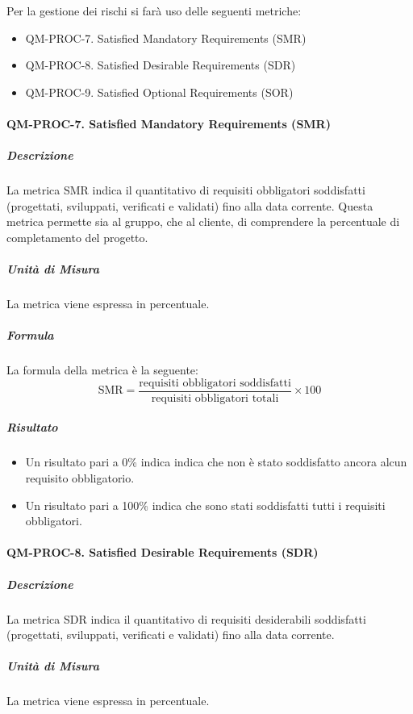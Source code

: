 		Per la gestione dei rischi si farà uso delle seguenti metriche:

		\begin{itemize}
			\item QM-PROC-7. Satisfied Mandatory Requirements (SMR)
			\item QM-PROC-8. Satisfied Desirable Requirements (SDR)
			\item QM-PROC-9. Satisfied Optional Requirements (SOR)
		\end{itemize}

		\paragraph{QM-PROC-7. Satisfied Mandatory Requirements (SMR)}

			\subparagraph{Descrizione}
			La metrica SMR indica il quantitativo di requisiti obbligatori soddisfatti (progettati, sviluppati, verificati e validati) fino alla data corrente. Questa metrica permette sia al gruppo, che al cliente, di comprendere la percentuale di completamento del progetto.

			\subparagraph{Unità di Misura}
			La metrica viene espressa in percentuale.

			\subparagraph{Formula}
			La formula della metrica è la seguente:
			\[
				\text{SMR} = \frac{\text{requisiti obbligatori soddisfatti}}{\text{requisiti obbligatori totali}} \times 100
			\]

			\subparagraph{Risultato}
			\begin{itemize}
				\item Un risultato pari a 0\% indica indica che non è stato soddisfatto ancora alcun requisito obbligatorio.
				\item Un risultato pari a 100\% indica che sono stati soddisfatti tutti i requisiti obbligatori.
			\end{itemize}

		\paragraph{QM-PROC-8. Satisfied Desirable Requirements (SDR)}

			\subparagraph{Descrizione}
			La metrica SDR indica il quantitativo di requisiti desiderabili soddisfatti (progettati, sviluppati, verificati e validati) fino alla data corrente.

			\subparagraph{Unità di Misura}
			La metrica viene espressa in percentuale.

